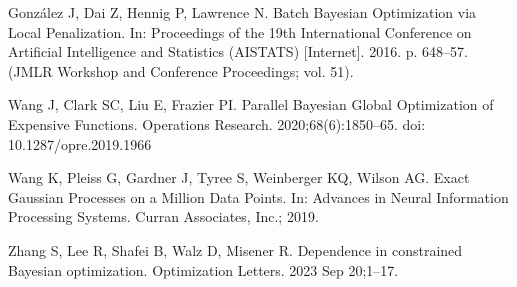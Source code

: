 \documentclass{IOS-Book-Article}
\begin{document}
\begin{thebibliography}{99}
		González J, Dai Z, Hennig P, Lawrence N. Batch Bayesian Optimization via Local Penalization. In: Proceedings of the 19th International Conference on Artificial Intelligence and Statistics (AISTATS) [Internet]. 2016. p. 648–57. (JMLR Workshop and Conference Proceedings; vol. 51).
		
		
		Wang J, Clark SC, Liu E, Frazier PI. Parallel Bayesian Global Optimization of Expensive Functions. Operations Research. 2020;68(6):1850–65. doi: 10.1287/opre.2019.1966
		
		Wang K, Pleiss G, Gardner J, Tyree S, Weinberger KQ, Wilson AG. Exact Gaussian Processes on a Million Data Points. In: Advances in Neural Information Processing Systems. Curran Associates, Inc.; 2019.
				
		Zhang S, Lee R, Shafei B, Walz D, Misener R. Dependence in constrained Bayesian optimization. Optimization Letters. 2023 Sep 20;1–17. 
		
		
	\end{thebibliography}
	
\end{document}
